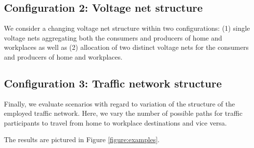\subsection{Configuration 2: Voltage net structure}
We consider a changing voltage net structure within two configurations: (1) single voltage nets aggregating both the consumers and producers of home and workplaces as well as (2) allocation of two distinct voltage nets for the consumers and producers of home and workplaces. 

\subsection{Configuration 3: Traffic network structure}
Finally, we evaluate scenarios with regard to variation of the structure of the employed traffic network. Here, we vary the number of possible paths for traffic participants to travel from home to workplace destinations and vice versa.  

The results are pictured in Figure \ref{figure:examples}. 

